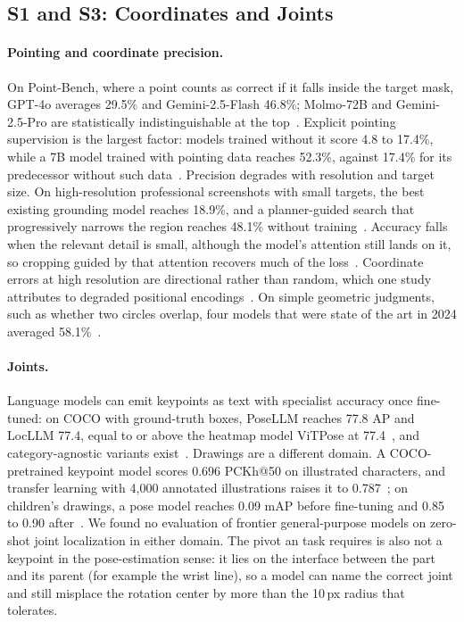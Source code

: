 \subsection{S1 and S3: Coordinates and Joints}
\label{sec:cutout-coords}

\paragraph{Pointing and coordinate precision.} On Point-Bench, where a point counts as correct if it falls inside the target mask, GPT-4o averages 29.5\% and Gemini-2.5-Flash 46.8\%; Molmo-72B and Gemini-2.5-Pro are statistically indistinguishable at the top~\citep{cheng2025pointarena}. Explicit pointing supervision is the largest factor: models trained without it score 4.8 to 17.4\%, while a 7B model trained with pointing data reaches 52.3\%, against 17.4\% for its predecessor without such data~\citep{cheng2025pointarena,deitke2025molmo}. Precision degrades with resolution and target size. On high-resolution professional screenshots with small targets, the best existing grounding model reaches 18.9\%, and a planner-guided search that progressively narrows the region reaches 48.1\% without training~\citep{li2025screenspotpro}. Accuracy falls when the relevant detail is small, although the model's attention still lands on it, so cropping guided by that attention recovers much of the loss~\citep{zhang2025wheretolook}. Coordinate errors at high resolution are directional rather than random, which one study attributes to degraded positional encodings~\citep{tao2025coordbias}. On simple geometric judgments, such as whether two circles overlap, four models that were state of the art in 2024 averaged 58.1\%~\citep{rahmanzadehgervi2024blind}.

\paragraph{Joints.} Language models can emit keypoints as text with specialist accuracy once fine-tuned: on COCO with ground-truth boxes, PoseLLM reaches 77.8 AP and LocLLM 77.4, equal to or above the heatmap model ViTPose at 77.4~\citep{zhang2025posellm,wang2024locllm}, and category-agnostic variants exist~\citep{kim2025capellm}. Drawings are a different domain. A COCO-pretrained keypoint model scores 0.696 PCKh@50 on illustrated characters, and transfer learning with 4{,}000 annotated illustrations raises it to 0.787~\citep{chen2022illustratedpose}; on children's drawings, a pose model reaches 0.09 mAP before fine-tuning and 0.85 to 0.90 after~\citep{smith2023animateddrawings}. We found no evaluation of frontier general-purpose models on zero-shot joint localization in either domain. The pivot an \anibench{} task requires is also not a keypoint in the pose-estimation sense: it lies on the interface between the part and its parent (for example the wrist line), so a model can name the correct joint and still misplace the rotation center by more than the 10\,px radius that  tolerates.

